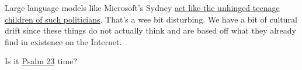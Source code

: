 Large language models like Microsoft's Sydney
\href{https://web.archive.org/web/20230217054245/https://theconversation.com/gaslighting-love-bombing-and-narcissism-why-is-microsofts-bing-ai-so-unhinged-200164}{act
like the unhinged teenage children of such politicians}. That's a wee
bit disturbing. We have a bit of cultural drift since these things do
not actually think and are based off what they already find in existence
on the Internet.

Is it
\href{https://www.biblegateway.com/passage/?search=Psalm+23\%3A4&version=CEB,GNT,NRSVACE}{Psalm
23} time?
